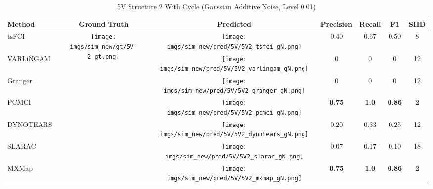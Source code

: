 \begin{table}[htb]
\begin{tabular}{l|c|c|c|c|c|c}
Method    & Ground Truth      & Predicted & Precision     & Recall       & F1            & SHD        \\ \hline
tsFCI     & \multirow{7}{*}[-9.6em]{\begin{minipage}{.17\linewidth} \centering \texttt{[image: imgs/sim\_new/gt/5V-2\_gt.png]} \end{minipage}} & \begin{minipage}{.17\linewidth} \centering \texttt{[image: imgs/sim\_new/pred/5V/5V2\_tsfci\_gN.png]} \end{minipage} & 0.40          & 0.67         & 0.50          & 8          \\
VARLiNGAM &                   &  \begin{minipage}{.17\linewidth} \centering \texttt{[image: imgs/sim\_new/pred/5V/5V2\_varlingam\_gN.png]} \end{minipage} & 0             & 0            & 0             & 12         \\
Granger   &                   &  \begin{minipage}{.17\linewidth} \centering \texttt{[image: imgs/sim\_new/pred/5V/5V2\_granger\_gN.png]} \end{minipage}   & 0             & 0            & 0             & 12         \\
PCMCI     &                   & \begin{minipage}{.17\linewidth} \centering \texttt{[image: imgs/sim\_new/pred/5V/5V2\_pcmci\_gN.png]} \end{minipage} & \textbf{0.75} & \textbf{1.0} & \textbf{0.86} & \textbf{2} \\
DYNOTEARS &                   &  \begin{minipage}{.17\linewidth} \centering \texttt{[image: imgs/sim\_new/pred/5V/5V2\_dynotears\_gN.png]} \end{minipage} & 0.20          & 0.33         & 0.25          & 12         \\
SLARAC    &                   &  \begin{minipage}{.17\linewidth} \centering \texttt{[image: imgs/sim\_new/pred/5V/5V2\_slarac\_gN.png]} \end{minipage}  & 0.07          & 0.17         & 0.10          & 18         \\ \cline{1-1} \cline{3-7} 
MXMap     &                   & \begin{minipage}{.17\linewidth} \centering \texttt{[image: imgs/sim\_new/pred/5V/5V2\_mxmap\_gN.png]} \end{minipage} & \textbf{0.75} & \textbf{1.0} & \textbf{0.86} & \textbf{2}
\end{tabular}
\caption{5V Structure 2 With Cycle (Gaussian Additive Noise, Level 0.01)}
\label{tab:5V2_gN}
\end{table}

